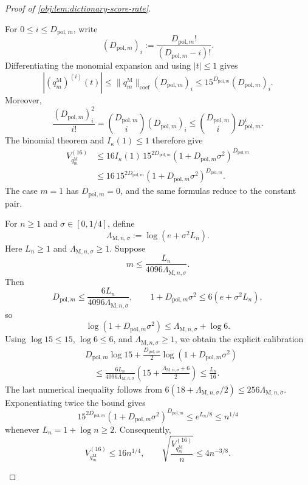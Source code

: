 \documentclass[11pt]{article}
\begin{document}
\begin{proof}[Proof of \cref{obj:lem:dictionary-score-rate}]
\begin{enumerate}
For \(0\le i\le D_{\mathrm{pol},m}\), write
\[
(D_{\mathrm{pol},m})_i
:=\frac{D_{\mathrm{pol},m}!}{(D_{\mathrm{pol},m}-i)!}.
\]
Differentiating the monomial expansion and using \(|t|\le1\) gives
\[
|(q_m^{\mathrm M})^{(i)}(t)|
\le\|q_m^{\mathrm M}\|_{\mathrm{coef}}(D_{\mathrm{pol},m})_i
\le15^{D_{\mathrm{pol},m}}(D_{\mathrm{pol},m})_i.
\]
Moreover,
\[
\frac{(D_{\mathrm{pol},m})_i^2}{i!}
=\binom{D_{\mathrm{pol},m}}i(D_{\mathrm{pol},m})_i
\le\binom{D_{\mathrm{pol},m}}iD_{\mathrm{pol},m}^i.
\]
The binomial theorem and \(I_\kappa(1)\le1\) therefore give
\[
\begin{aligned}
V_{q_m^{\mathrm M}}^{(16)}
&\le16I_\kappa(1)\,15^{2D_{\mathrm{pol},m}}
       (1+D_{\mathrm{pol},m}\sigma^2)^{D_{\mathrm{pol},m}}\\
&\le16\,15^{2D_{\mathrm{pol},m}}
       (1+D_{\mathrm{pol},m}\sigma^2)^{D_{\mathrm{pol},m}}.
\end{aligned}
\]
The case \(m=1\) has \(D_{\mathrm{pol},m}=0\), and the same formulas reduce to the constant pair.

For \(n\ge1\) and \(\sigma\in[0,1/4]\), define
\[
\Lambda_{\mathrm M,n,\sigma}:=\log(e+\sigma^2L_n).
\]
Here \(L_n\ge1\) and \(\Lambda_{\mathrm M,n,\sigma}\ge1\). Suppose
\[
m\le\frac{L_n}{4096\Lambda_{\mathrm M,n,\sigma}}.
\]
Then
\[
D_{\mathrm{pol},m}
\le\frac{6L_n}{4096\Lambda_{\mathrm M,n,\sigma}},
\qquad
1+D_{\mathrm{pol},m}\sigma^2
\le6(e+\sigma^2L_n),
\]
so
\[
\log(1+D_{\mathrm{pol},m}\sigma^2)
\le\Lambda_{\mathrm M,n,\sigma}+\log6.
\]
Using \(\log15\le15\), \(\log6\le6\), and
\(\Lambda_{\mathrm M,n,\sigma}\ge1\), we obtain the explicit calibration
\[
\begin{aligned}
&D_{\mathrm{pol},m}\log15
+\frac{D_{\mathrm{pol},m}}2
 \log(1+D_{\mathrm{pol},m}\sigma^2)\\
&\quad\le
\frac{6L_n}{4096\Lambda_{\mathrm M,n,\sigma}}
\left(15+\frac{\Lambda_{\mathrm M,n,\sigma}+6}{2}\right)
\le\frac{L_n}{16}.
\end{aligned}
\]
The last numerical inequality follows from
\(6(18+\Lambda_{\mathrm M,n,\sigma}/2)
\le256\Lambda_{\mathrm M,n,\sigma}\).
Exponentiating twice the bound gives
\[
15^{2D_{\mathrm{pol},m}}
(1+D_{\mathrm{pol},m}\sigma^2)^{D_{\mathrm{pol},m}}
\le e^{L_n/8}\le n^{1/4}
\]
whenever \(L_n=1+\log n\ge2\). Consequently,
\[
V_{q_m^{\mathrm M}}^{(16)}\le16n^{1/4},
\qquad
\sqrt{\frac{V_{q_m^{\mathrm M}}^{(16)}}{n}}\le4n^{-3/8}.
\]


\end{enumerate}
\end{proof}
\end{document}
